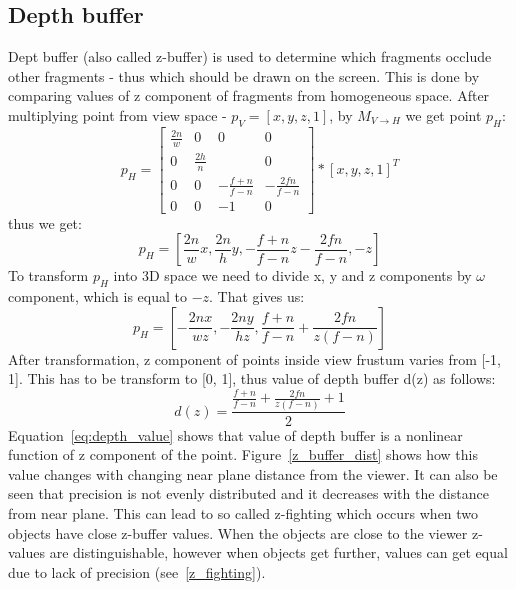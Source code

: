 \subsection{Depth buffer} \label{sec:depth_buffer}
Dept buffer (also called z-buffer) is used to determine which fragments occlude other fragments - thus which should be drawn on the screen. This is done by comparing values of z component of fragments from homogeneous space. 
After multiplying point from view space - $p_V = [x, y, z, 1]$,  by $M_{V \to H}$ we get point $p_H$:
\begin{equation}
\label{eg:projection_transformation}
p_H =
\begin{bmatrix}
\frac{2n}{w} & 0            & 0                & 0                \\ 
0            & \frac{2h}{n} &                  & 0                 \\ 
0            & 0            & -\frac{f+n}{f-n} & -\frac{2fn}{f-n} \\ 
0            & 0            & -1               & 0
\end{bmatrix}
*[x, y, z, 1]^T
\end{equation}
thus we get:
\begin{equation}
\label{eg:after_perspective_projection}
p_H = [\frac{2n}{w}x, \frac{2n}{h}y, -\frac{f+n}{f-n}z - \frac{2fn}{f-n}, -z]
\end{equation}
To transform $p_H$ into 3D space we need to divide x, y and z components by $\omega$ component, which is equal to $-z$. That gives us:
\begin{equation}
\label{eg:after_perspective_projection}
p_H = [-\frac{2nx}{wz},-\frac{2ny}{hz}, \frac{f+n}{f-n} + \frac{2fn}{z(f-n)}]
\end{equation}
After transformation, z component of points inside view frustum varies from [-1, 1]. This has to be transform to [0, 1], thus value of depth buffer d(z) as follows:
\begin{equation}
\label{eq:depth_value}
d(z) = \frac{\frac{f+n}{f-n} + \frac{2fn}{z(f-n)} + 1}{2}
\end{equation}
Equation~\ref{eq:depth_value} shows that value of depth buffer is a nonlinear function of z component of the point. Figure~\ref{z_buffer_dist} shows how this value changes with changing near plane distance from the viewer. It can also be seen that precision is not evenly distributed and it decreases with the distance from near plane. This can lead to so called z-fighting which occurs when two objects have close z-buffer values. When the objects are close to the viewer z-values are distinguishable, however when objects get further, values can get equal due to lack of precision (see~\ref{z_fighting}).

